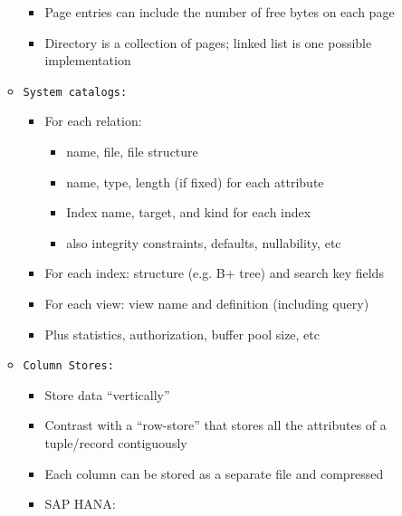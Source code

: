 \documentclass[landscape,8pt]{extarticle}
\newcommand{\code}{\lstinline}
\begin{document}
\begin{multicols}{4}
\begin{itemize}
\begin{itemize}
                        \begin{itemize}
                            \item Page entries can include the number of free bytes on each page
                            \item Directory is a collection of pages; linked list is one possible implementation
                        \end{itemize}
                  \item \code{System catalogs:}
                        \begin{itemize}
                            \item For each relation:
                                  \begin{itemize}
                                      \item name, file, file structure
                                      \item name, type, length (if fixed) for each attribute
                                      \item Index name, target, and kind for each index
                                      \item also integrity constraints, defaults, nullability, etc
                                  \end{itemize}
                            \item For each index: structure (e.g. B+ tree) and search key fields
                            \item For each view: view name and definition (including query)
                            \item Plus statistics, authorization, buffer pool size, etc
                        \end{itemize}
                  \item \code{Column Stores:}
                        \begin{itemize}
                            \item Store data ``vertically''
                            \item Contrast with a ``row-store'' that stores all the attributes of a tuple/record contiguously
                            \item Each column can be stored as a separate file and compressed
                            \item SAP HANA:
                                  \begin{itemize}

\end{itemize}
\end{itemize}
\end{itemize}
\end{itemize}
\end{multicols}
\end{document}
